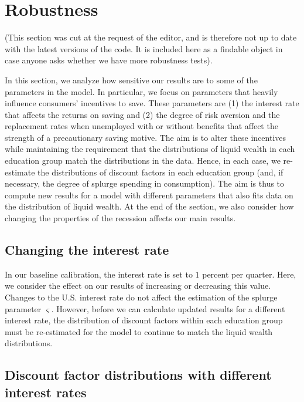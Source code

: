\documentclass[\PathToRoot/\ProjectName]{subfiles}
\begin{document}
\FloatBarrier
\hypertarget{robustness}{}

\section*{Robustness}
\whenintegrated{\label{sec:robustness}} 

(This section was cut at the request of the editor, and is therefore not up to date with the latest versions of the code.  It is included here as a findable object in case anyone asks whether we have more robustness tests).

In this section, we analyze how sensitive our results are to some of the parameters in the model. In particular, we focus on parameters that heavily influence consumers' incentives to save. These parameters are (1) the interest rate that affects the returns on saving and (2) the degree of risk aversion and the replacement rates when unemployed with or without benefits that affect the strength of a precautionary saving motive. The aim is to alter these incentives while maintaining the requirement that the distributions of liquid wealth in each education group match the distributions in the data. Hence, in each case, we re-estimate the distributions of discount factors in each education group (and, if necessary, the degree of splurge spending in consumption). The aim is thus to compute new results for a model with different parameters that also fits data on the distribution of liquid wealth. At the end of the section, we also consider how changing the properties of the recession affects our main results.

\hypertarget{changing-the-interest-rate}{}\par\subsection*{Changing the interest rate}
\whenintegrated{\label{sec:robust_R}} 
In our baseline calibration, the interest rate is set to $1$ percent per quarter. Here, we consider the effect on our results of increasing or decreasing this value. Changes to the U.S. interest rate do not affect the estimation of the splurge parameter $\varsigma$. However, before we can calculate updated results for a different interest rate, the distribution of discount factors within each education group must be re-estimated for the model to continue to match the liquid wealth distributions.

\subsection*{Discount factor distributions with different interest rates}
\whenintegrated{\label{sec:robust_R_estim}} 
\end{document}
